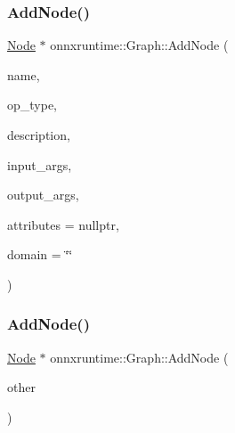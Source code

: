 \subsubsection{\texorpdfstring{Add\+Node()}{AddNode()}\hspace{0.1cm}{\footnotesize\ttfamily [1/2]}}
{\footnotesize\ttfamily \mbox{\hyperlink{classonnxruntime_1_1Node}{Node}} $\ast$ onnxruntime\+::\+Graph\+::\+Add\+Node (\begin{DoxyParamCaption}\item[{const std\+::string \&}]{name,  }\item[{const std\+::string \&}]{op\+\_\+type,  }\item[{const std\+::string \&}]{description,  }\item[{const std\+::vector$<$ \mbox{\hyperlink{classonnxruntime_1_1NodeArg}{Node\+Arg}} $\ast$$>$ \&}]{input\+\_\+args,  }\item[{const std\+::vector$<$ \mbox{\hyperlink{classonnxruntime_1_1NodeArg}{Node\+Arg}} $\ast$$>$ \&}]{output\+\_\+args,  }\item[{const \mbox{\hyperlink{namespaceonnxruntime_a7fa616c461850e300cfa552afd46eed4}{Node\+Attributes}} $\ast$}]{attributes = {\ttfamily nullptr},  }\item[{const std\+::string \&}]{domain = {\ttfamily \char`\"{}\char`\"{}} }\end{DoxyParamCaption})}

\mbox{\label{classonnxruntime_1_1Graph_a667f9dc9ebc7f8d3d0737161fbcee1cd}} 
\subsubsection{\texorpdfstring{Add\+Node()}{AddNode()}\hspace{0.1cm}{\footnotesize\ttfamily [2/2]}}
{\footnotesize\ttfamily \mbox{\hyperlink{classonnxruntime_1_1Node}{Node}} $\ast$ onnxruntime\+::\+Graph\+::\+Add\+Node (\begin{DoxyParamCaption}\item[{const \mbox{\hyperlink{classonnxruntime_1_1Node}{Node}} \&}]{other }\end{DoxyParamCaption})}

\mbox{\label{classonnxruntime_1_1Graph_ac88de928fb7e920ec2028ac5f049ecc3}} 
